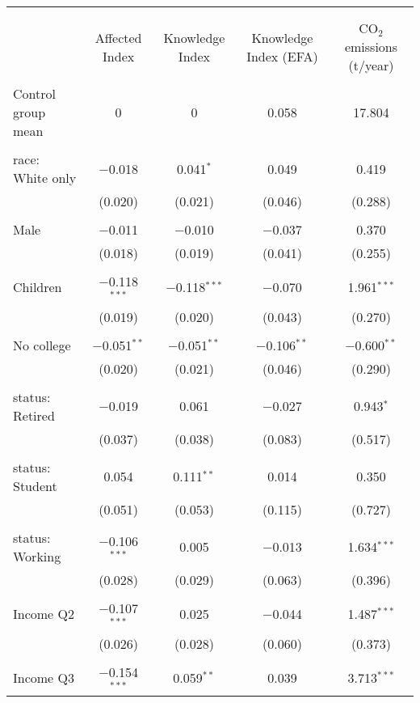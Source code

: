 
\begin{tabular}{@{\extracolsep{5pt}}lcccc} 
\\[-1.8ex]\hline 
\hline \\[-1.8ex] 
\\[-1.8ex] & Affected Index & Knowledge Index & Knowledge Index (EFA) & CO$_{2}$ emissions (t/year) \\ 
\hline \\[-1.8ex] 
 Control group mean & 0 & 0 & 0.058 & 17.804  \\ \hline \\[-1.8ex] race: White only & $-$0.018 & 0.041$^{*}$ & 0.049 & 0.419 \\ 
  & (0.020) & (0.021) & (0.046) & (0.288) \\ 
  & & & & \\ 
 Male & $-$0.011 & $-$0.010 & $-$0.037 & 0.370 \\ 
  & (0.018) & (0.019) & (0.041) & (0.255) \\ 
  & & & & \\ 
 Children & $-$0.118$^{***}$ & $-$0.118$^{***}$ & $-$0.070 & 1.961$^{***}$ \\ 
  & (0.019) & (0.020) & (0.043) & (0.270) \\ 
  & & & & \\ 
 No college & $-$0.051$^{**}$ & $-$0.051$^{**}$ & $-$0.106$^{**}$ & $-$0.600$^{**}$ \\ 
  & (0.020) & (0.021) & (0.046) & (0.290) \\ 
  & & & & \\ 
 status: Retired & $-$0.019 & 0.061 & $-$0.027 & 0.943$^{*}$ \\ 
  & (0.037) & (0.038) & (0.083) & (0.517) \\ 
  & & & & \\ 
 status: Student & 0.054 & 0.111$^{**}$ & 0.014 & 0.350 \\ 
  & (0.051) & (0.053) & (0.115) & (0.727) \\ 
  & & & & \\ 
 status: Working & $-$0.106$^{***}$ & 0.005 & $-$0.013 & 1.634$^{***}$ \\ 
  & (0.028) & (0.029) & (0.063) & (0.396) \\ 
  & & & & \\ 
 Income Q2 & $-$0.107$^{***}$ & 0.025 & $-$0.044 & 1.487$^{***}$ \\ 
  & (0.026) & (0.028) & (0.060) & (0.373) \\ 
  & & & & \\ 
 Income Q3 & $-$0.154$^{***}$ & 0.059$^{**}$ & 0.039 & 3.713$^{***}$ \\ 

\end{tabular}
